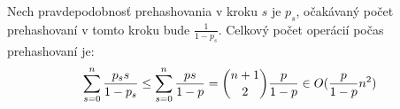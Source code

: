 Nech pravdepodobnosť prehashovania v kroku $s$ je $p_s$, očakávaný počet prehashovaní v tomto kroku bude $\frac{1}{1-p_s}$. Celkový počet operácií počas prehashovaní je:
\begin{displaymath}
\displaystyle\sum_{s = 0}^{n} \frac{p_s s}{1-p_s} \leq \displaystyle\sum_{s = 0}^{n} \frac{p s}{1-p} = \dbinom{n+1}{2} \frac{p}{1-p} \in O(\frac{p}{1-p} n^2)
\end{displaymath}
